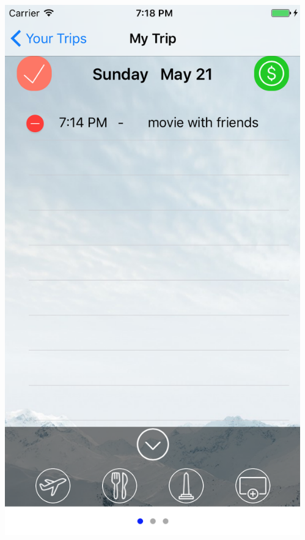 \documentclass{beamer}
\begin{document}
\begin{frame}
\begin{columns}
\begin{column}{0.3\textwidth}
\begin{center}
        \end{center}
    \end{column}
    \begin{column}{0.3\textwidth}  %
        \begin{center}
            \includegraphics[scale=0.3]{itinerary2}
        \end{center}
    \end{column}
\end{columns}
\end{frame}
\end{document}
